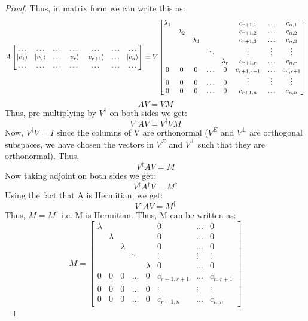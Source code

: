 \begin{proof}
    Thus, in matrix form we can write this as:
    \[A\begin{bmatrix} \ldots & \ldots & \ldots & \ldots & \ldots & \ldots & \ldots \\ \ket{v_1} & \ket{v_2} & \ldots & \ket{v_r} & \ket{v_{r+1}} & \ldots & \ket{v_n} \\ \ldots & \ldots & \ldots & \ldots & \ldots  & \ldots & \ldots \end{bmatrix} = V\begin{bmatrix} \lambda_1 & & & & & c_{r+1,1} & \ldots & c_{n,1} \\ & \lambda_2 & & & & c_{r+1,2} & \ldots & c_{n,2} \\ & & \lambda_3 & & & c_{r+1,3} & \ldots & c_{n,3} \\ & & & \ddots & & \vdots & \vdots & \vdots \\ & & & & \lambda_r & c_{r+1,r} & \ldots & c_{n,r} \\ 0 & 0 & 0 & \ldots & 0 & c_{r+1,r+1} & \ldots & c_{n,r+1} \\ 0 & 0 & 0 & \ldots & 0 & \vdots & \vdots & \vdots \\ 0 & 0 & 0 & \ldots & 0 & c_{r+1,n} & \ldots & c_{n,n} \end{bmatrix}\] 
    \[AV=VM\]
    Thus, pre-multiplying by $V^{\dagger}$ on both sides we get:
    \[V^{\dagger}AV=V^{\dagger}VM \]
    Now, $V^{\dagger}V=I$ since the columns of V are orthonormal ($V^E$ and $V^{\perp}$ are orthogonal subspaces, we have chosen the vectors in $V^E$ and $V^{\perp}$ such that they are orthonormal). Thus,
    \[V^{\dagger}AV=M \]
    Now taking adjoint on both sides we get:
    \[V^{\dagger}A^{\dagger}V=M^{\dagger} \]
    Using the fact that A is Hermitian, we get:
    \[V^{\dagger}AV=M^{\dagger} \]
    Thus, $M=M^{\dagger}$ i.e. M is Hermitian. Thus, M can be written as:
    \[ M=\begin{bmatrix} \lambda & & & & & 0 & \ldots & 0 \\ & \lambda & & & & 0 & \ldots & 0 \\ & & \lambda & & & 0 & \ldots & 0 \\ & & & \ddots & & \vdots & \vdots & \vdots \\ & & & & \lambda & 0 & \ldots & 0 \\ 0 & 0 & 0 & \ldots & 0 & c_{r+1,r+1} & \ldots & c_{n,r+1} \\ 0 & 0 & 0 & \ldots & 0 & \vdots & \vdots & \vdots \\ 0 & 0 & 0 & \ldots & 0 & c_{r+1,n} & \ldots & c_{n,n} \end{bmatrix}\]

\end{proof}
